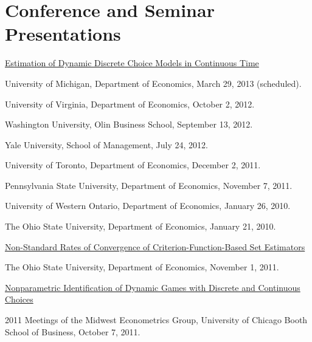 \documentclass[10pt,letterpaper]{article}
\renewenvironment{itemize}{
  \begin{list}{}{
    \setlength{\leftmargin}{1.5em}
    \setlength{\itemsep}{0.25em}
    \setlength{\parskip}{0pt}
    \setlength{\parsep}{0.25em}
  }
}{
  \end{list}
}
\begin{document}
\section*{Conference and Seminar Presentations}

\begin{itemize}

\item \href{http://jblevins.org/research/abbe}{Estimation of Dynamic Discrete Choice Models in Continuous Time}

  \begin{itemize}
  \item University of Michigan, Department of Economics,
    March 29, 2013 (scheduled).
  \item University of Virginia, Department of Economics,
    October 2, 2012.
  \item Washington University, Olin Business School,
    September 13, 2012.
  \item Yale University, School of Management,
    July 24, 2012.
  \item University of Toronto, Department of Economics,
    December 2, 2011.
  \item Pennsylvania State University, Department of Economics,
    November 7, 2011.
  \item University of Western Ontario, Department of Economics,
    January 26, 2010.
  \item The Ohio State University, Department of Economics,
    January 21, 2010.
  \end{itemize}

\item \href{http://jblevins.org/research/cuberoot}{Non-Standard Rates of Convergence of Criterion-Function-Based Set Estimators}

  \begin{itemize}
  \item The Ohio State University, Department of Economics,
    November 1, 2011.
  \end{itemize}

\item \href{http://jblevins.org/research/dcident}{Nonparametric Identification of Dynamic Games with Discrete and Continuous Choices}

  \begin{itemize}
    \item 2011 Meetings of the Midwest Econometrics Group,
      University of Chicago Booth School of Business,
      October 7, 2011.
  \end{itemize}


\end{itemize}
\end{document}
